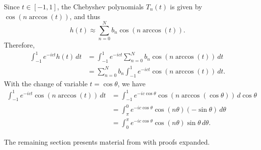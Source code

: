 \documentclass[12pt, oneside, a4paper]{article}
\begin{document}
Since $t\in [-1,1]$, the Chebyshev polynomials $T_n(t)$ is given by $\cos(n\arccos(t))$, and thus
\[h(t) \approx \sum_{n=0}^N b_n \cos(n \arccos(t)).\]
Therefore,
\begin{align*}
    \int_{-1}^1 e^{-ict} h(t)\,dt &= \int_{-1}^1 e^{-ict} \sum_{n=0}^N b_n \cos(n \arccos(t))\,dt \\
    &= \sum_{n=0}^N b_n \int_{-1}^1 e^{-ict}\cos(n \arccos(t))\,dt.
\end{align*}
With the change of variable $t=\cos\theta$, we have
\begin{align*}
    \int_{-1}^1 e^{-ict}\cos(n \arccos(t))\,dt &= \int_{-1}^1 e^{-ic\cos\theta}\cos(n \arccos(\cos\theta))\,d\cos\theta\\
    &= \int_\pi^0 e^{-ic\cos\theta} \cos(n\theta) (-\sin\theta)\,d\theta\\
    &= \int_0^\pi e^{-ic\cos\theta} \cos(n\theta) \sin\theta\,d\theta.
\end{align*}

The remaining section presents material from \cite{Fokas2012} with proofs expanded.
\end{document}

